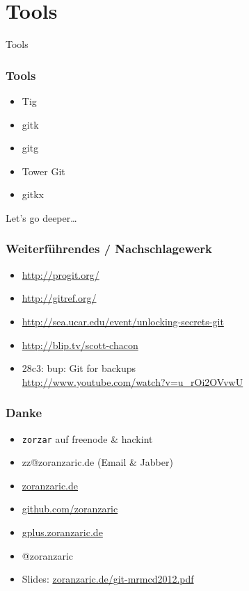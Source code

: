 \documentclass[]{beamer}
\begin{document}
\section{Tools}
\begin{frame}
	\fontsize{30}{10}\selectfont Tools
\end{frame}

\begin{frame}
	\frametitle{Tools}
	\begin{itemize}
		\item
			Tig
		\item
			gitk
		\item
			gitg
		\item
			Tower Git
		\item
			gitkx
	\end{itemize}
\end{frame}

\begin{frame}
	\fontsize{30}{10}\selectfont Let's go deeper\ldots
\end{frame}
\begin{frame}
	\frametitle{Weiterführendes / Nachschlagewerk}
	\begin{itemize}
		\item
			\url{http://progit.org/}
		\item
			\url{http://gitref.org/}
		\item
			\url{http://sea.ucar.edu/event/unlocking-secrets-git}
		\item
			\url{http://blip.tv/scott-chacon}
		\item
			28c3: bup: Git for backups\\
			\url{http://www.youtube.com/watch?v=u_rOi2OVvwU}
	\end{itemize}
\end{frame}

\begin{frame}[fragile]
	\frametitle{Danke}
	\begin{itemize}
		\item
			\verb|zorzar| auf freenode \& hackint
		\item
			zz@zoranzaric.de (Email \& Jabber)
		\item
			\url{zoranzaric.de}
		\item
			\url{github.com/zoranzaric}
		\item
			\url{gplus.zoranzaric.de}
		\item
			@zoranzaric\\[0.5cm]
		\item
			Slides: \url{zoranzaric.de/git-mrmcd2012.pdf}
	\end{itemize}
\end{frame}
\end{document}
